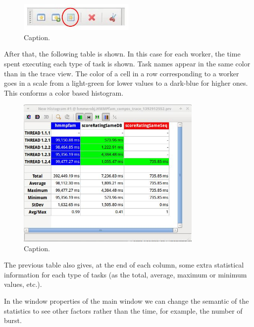 \begin{figure}[ht!]
  \centering
    \includegraphics[width=0.5\textwidth]{./Sections/4_Tools/Figures/12.jpeg}
    \caption{Caption.}
\end{figure}

After that, the following table is shown. In this case for each worker, the time spent 
executing each type of task is shown. Task names appear in the same color than in the 
trace view. The color of a cell in a row corresponding to a worker goes in a scale from 
a light-green for lower values to a dark-blue for higher ones. This conforms a color based histogram.

\begin{figure}[ht!]
  \centering
    \includegraphics[width=0.8\textwidth]{./Sections/4_Tools/Figures/13.jpeg}
    \caption{Caption.}
\end{figure}
 
The previous table also gives, at the end of each column, some extra statistical 
information for each type of tasks (as the total, average, maximum or minimum values, etc.).

In the window properties of the main window we can change the semantic of the statistics 
to see other factors rather than the time, for example, the number of burst.

